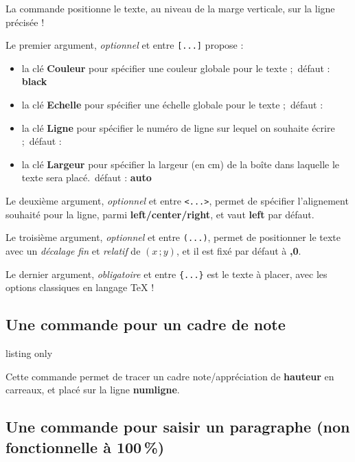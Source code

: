 \documentclass[a4paper]{article}
\newcommand\Cle[1]{{\bfseries\sffamily\textlangle #1\textrangle}}
\begin{document}
La commande positionne le \textsf{texte}, au niveau de la marge verticale, sur la ligne précisée !

\smallskip

Le premier argument, \textit{optionnel} et entre \texttt{[...]} propose :

\begin{itemize}
	\item la clé \Cle{Couleur} pour spécifier une couleur globale pour le texte ;\hfill~défaut : \Cle{black}
	\item la clé \Cle{Echelle} pour spécifier une échelle globale pour le texte ;\hfill~défaut : \Cle{1}
	\item la clé \Cle{Ligne} pour spécifier le numéro de ligne sur lequel on souhaite écrire ;\hfill~défaut : \Cle{1}
	\item la clé \Cle{Largeur} pour spécifier la largeur (en cm) de la boîte dans laquelle le texte sera placé.\hfill~défaut : \Cle{auto}
\end{itemize}

Le deuxième argument, \textit{optionnel} et entre \texttt{<...>}, permet de spécifier l'alignement souhaité pour la ligne, parmi \Cle{left/center/right}, et vaut \Cle{left} par défaut.

\smallskip

Le troisième argument, \textit{optionnel} et entre \texttt{(...)}, permet de positionner le texte avec un \textit{décalage fin} et \textit{relatif} de $(x\,;y)$, et il est fixé par défaut à \Cle{0,0}.

\smallskip

Le dernier argument, \textit{obligatoire} et entre \texttt{\{...\}} est le texte à placer, avec les options classiques en langage \TeX{} !

\subsection{Une commande pour un cadre de note}

\begin{PresentationCode}{listing only}
\end{PresentationCode}

Cette commande permet de tracer un cadre \textsf{note/appréciation} de \Cle{hauteur} en carreaux, et placé sur la ligne \Cle{numligne}.

\pagebreak

\subsection{Une commande pour saisir un paragraphe (non fonctionnelle à 100\,\%)}
\end{document}
